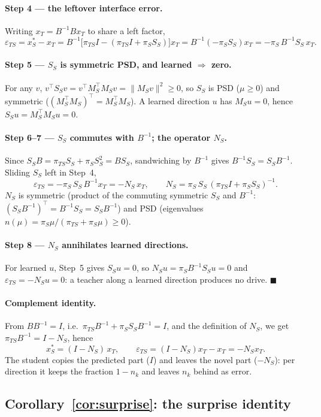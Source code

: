 \documentclass[10pt,letterpaper]{article}
\theoremstyle{plain}
\theoremstyle{remark}
\newcommand{\eps}{\varepsilon}
\newcommand{\xT}{x_T}
\newcommand{\xS}{x_S}
\newcommand{\MS}{M_S}
\renewcommand{\SS}{S_S}
\newcommand{\NS}{N_S}
\newcommand{\epsTS}{\eps_{TS}}
\newcommand{\piS}{\pi_S}
\newcommand{\piTS}{\pi_{TS}}
\newcommand{\tr}{^{\!\top}}
\begin{document}
\paragraph{Step 4 --- the leftover interface error.} Writing $\xT=B^{-1}B\xT$ to share a left factor,
\[
\epsTS=\xS^{*}-\xT=B^{-1}\big[\piTS I-(\piTS I+\piS\SS)\big]\xT=B^{-1}(-\piS\SS)\xT=-\piS\,B^{-1}\SS\,\xT.
\]

\paragraph{Step 5 --- $\SS$ is symmetric PSD, and learned $\Rightarrow$ zero.} For any $v$,
$v\tr\SS v=v\tr\MS\tr\MS v=\|\MS v\|^2\ge0$, so $\SS$ is PSD ($\mu\ge0$) and symmetric ($(\MS\tr\MS)\tr=\MS\tr\MS$).
A learned direction $u$ has $\MS u=0$, hence $\SS u=\MS\tr\MS u=0$.

\paragraph{Step 6--7 --- $\SS$ commutes with $B^{-1}$; the operator $\NS$.} Since $\SS
B=\piTS\SS+\piS\SS^2=B\SS$, sandwiching by $B^{-1}$ gives $B^{-1}\SS=\SS B^{-1}$. Sliding $\SS$ left in
Step~4,
\[
\epsTS=-\piS\,\SS\,B^{-1}\xT=-\NS\,\xT,\qquad
\NS=\piS\,\SS\,(\piTS I+\piS\SS)^{-1}.
\]
$\NS$ is symmetric (product of the commuting symmetric $\SS$ and $B^{-1}$: $(\SS B^{-1})\tr=B^{-1}\SS=\SS
B^{-1}$) and PSD (eigenvalues $n(\mu)=\piS\mu/(\piTS+\piS\mu)\ge0$).

\paragraph{Step 8 --- $\NS$ annihilates learned directions.} For learned $u$, Step~5 gives $\SS u=0$, so
$\NS u=\piS B^{-1}\SS u=0$ and $\epsTS=-\NS u=0$: a teacher along a learned direction produces no drive.
\hfill$\blacksquare$

\paragraph{Complement identity.} From $B B^{-1}=I$, i.e.\ $\piTS B^{-1}+\piS\SS B^{-1}=I$, and the
definition of $\NS$, we get $\piTS B^{-1}=I-\NS$, hence
\[
\xS^{*}=(I-\NS)\,\xT,\qquad \epsTS=(I-\NS)\xT-\xT=-\NS\xT.
\]
The student copies the predicted part ($I$) and leaves the novel part ($-\NS$): per direction it keeps
the fraction $1-n_k$ and leaves $n_k$ behind as error.

\subsection{Corollary~\ref{cor:surprise}: the surprise identity}
\label{app:cor1}
\end{document}
